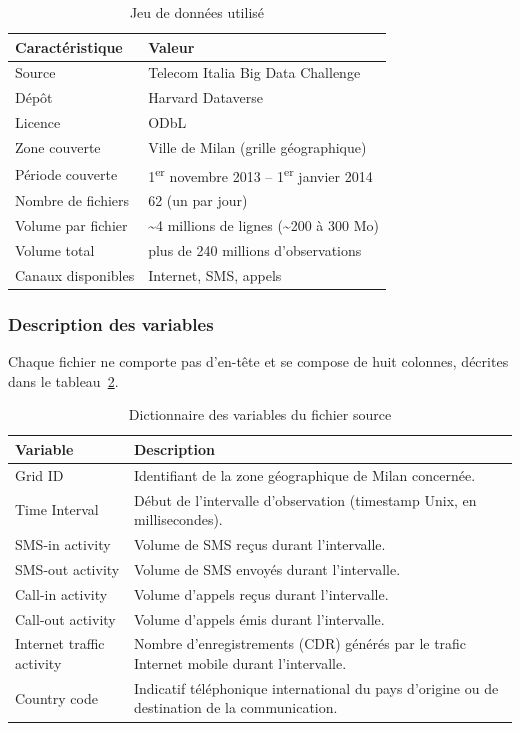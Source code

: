 \begin{table}[htbp]
  \centering
  \caption{Jeu de données utilisé}
  \label{tab:dataset}
  \begin{tabular}{ll}
    \toprule
    \textbf{Caractéristique} & \textbf{Valeur} \\
    \midrule
    Source & Telecom Italia Big Data Challenge \\
    Dépôt & Harvard Dataverse \\
    Licence & ODbL \\
    Zone couverte & Ville de Milan (grille géographique) \\
    Période couverte & 1\textsuperscript{er} novembre 2013 -- 1\textsuperscript{er} janvier 2014 \\
    Nombre de fichiers & 62 (un par jour) \\
    Volume par fichier & \textasciitilde{}4 millions de lignes (\textasciitilde{}200 à 300 Mo) \\
    Volume total & plus de 240 millions d'observations \\
    Canaux disponibles & Internet, SMS, appels \\
    \bottomrule
  \end{tabular}
\end{table}

\subsubsection{Description des variables}

Chaque fichier ne comporte pas d'en-tête et se compose de huit
colonnes, décrites dans le tableau~\ref{tab:variables}.

\begin{table}[htbp]
  \centering
  \caption{Dictionnaire des variables du fichier source}
  \label{tab:variables}
  \begin{tabular}{lp{9.5cm}}
    \toprule
    \textbf{Variable} & \textbf{Description} \\
    \midrule
    Grid ID    & Identifiant de la zone géographique de Milan concernée. \\
    Time Interval & Début de l'intervalle d'observation (timestamp Unix, en millisecondes). \\
    SMS-in activity & Volume de SMS reçus durant l'intervalle. \\
    SMS-out activity & Volume de SMS envoyés durant l'intervalle. \\
    Call-in activity & Volume d'appels reçus durant l'intervalle. \\
    Call-out activity & Volume d'appels émis durant l'intervalle. \\
    Internet traffic activity & Nombre d'enregistrements (CDR) générés par le trafic Internet mobile durant l'intervalle. \\
    Country code & Indicatif téléphonique international du pays d'origine ou de destination de la communication. \\
    \bottomrule
  \end{tabular}
\end{table}

